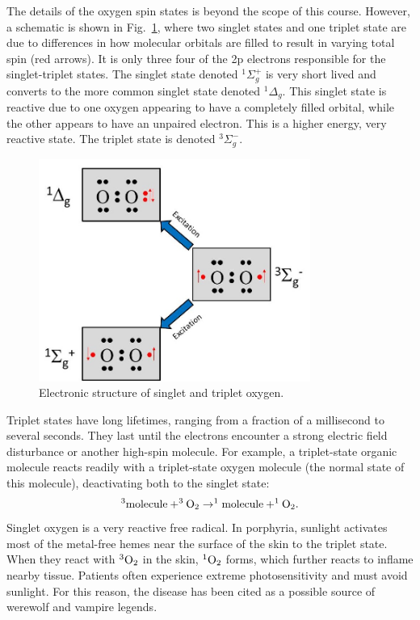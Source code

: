 The details of the oxygen spin states is beyond the scope of this course. However, a schematic is shown in Fig.~\ref{Fig7-5}, where two singlet states and one triplet state are due to differences in how molecular orbitals are filled to result in varying total spin (red arrows). It is only three four of the 2p electrons responsible for the singlet-triplet states. The singlet state denoted $^1\Sigma_g^+$ is very short lived and converts to the more common singlet state denoted $^1\Delta_g$. This singlet state is reactive due to one oxygen appearing to have a completely filled orbital, while the other appears to have an unpaired electron. This is a higher energy, very reactive state. The triplet state is denoted $^3\Sigma_g^-$.
\begin{figure}[h]
	\centering
	\includegraphics[width=3.5in]{./figures/Topic7/Fig7-5.jpg}
	\caption{Electronic structure of singlet and triplet oxygen.}
	\label{Fig7-5}
\end{figure}

Triplet states have long lifetimes, ranging from a fraction of a millisecond to several seconds.  They last until the electrons encounter a strong electric field disturbance or another high-spin molecule.  For example, a triplet-state organic molecule reacts readily with a triplet-state oxygen molecule (the normal state of this molecule), deactivating both to the singlet state: 
$$^3{\rm molecule}+^3{\rm O}_2 \rightarrow ^1{\rm molecule}+^1{\rm O}_2.$$
Singlet oxygen is a very reactive free radical.  In porphyria, sunlight activates most of the metal-free hemes near the surface of the skin to the triplet state.  When they react with $^3{\rm O}_2$ in the skin, $^1{\rm O}_2$ forms, which further reacts to inflame nearby tissue.  Patients often experience extreme photosensitivity and must avoid sunlight.  For this reason, the disease has been cited as a possible source of werewolf and vampire legends.

